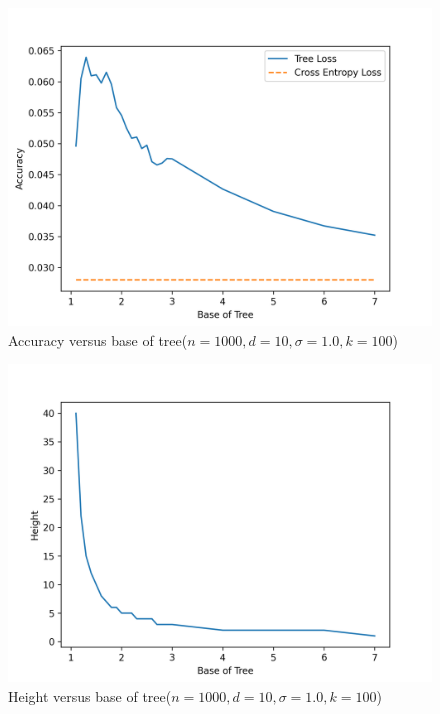 \documentclass[twoside]{article}
\theoremstyle{definition}
\begin{document}
\begin{figure}[h]
\vspace{.3in}
\includegraphics[width=\linewidth]{fig/new_img/accuracy_vs_base.png}
\vspace{.3in}
\caption{\small Accuracy versus base of tree($n=1000, d=10, \sigma=1.0, k=100$)}
\label{accuracy_vs_base}
\end{figure}

\begin{figure}[h]
\vspace{.3in}
\includegraphics[width=\linewidth]{fig/new_img/height_vs_base.png}
\vspace{.3in}
\caption{\small Height versus base of tree($n=1000, d=10, \sigma=1.0, k=100$)}
\label{height_vs_base}
\end{figure}
\end{document}
